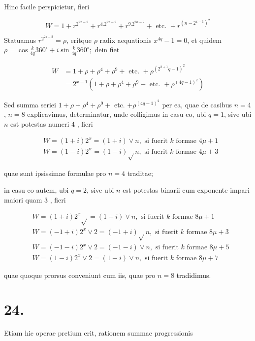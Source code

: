 \documentclass[10pt]{article}
\begin{document}
Hinc facile perspicietur, fieri

\[
W=1+r^{2^{2 x-2}}+r^{4.2^{2 x-2}}+r^{9.2^{2 \alpha-2}}+\text { etc. }+r^{\left(n-2^{x-1}\right)^{2}}
\]

Statuamus \(r^{2^{2 z-2}}=\rho\), eritque \(\rho\) radix aequationis \(x^{4 q}-1=0\), et quidem \(\rho=\cos \frac{k}{4 q} 360^{\circ}+i \sin \frac{k}{4 q} 360^{\circ} ;\) dein fiet

\[
\begin{aligned}
W & =1+\rho+\rho^{4}+\rho^{9}+\text { etc. }+\rho^{\left(2^{2+1} q-1\right)^{2}} \\
& =2^{x-1}\left(1+\rho+\rho^{4}+\rho^{9}+\text { etc. }+\rho^{(4 q-1)^{2}}\right)
\end{aligned}
\]

Sed summa seriei \(1+\rho+\rho^{4}+\rho^{9}+\) etc. \(+\rho^{(4 q-1)^{2}}\) per ea, quae de casibus \(n=4\), \(n=8\) explicavimus, determinatur, unde colligimus in casu eo, ubi \(q=1\), sive ubi \(n\) est potestas numeri 4 , fieri

\[
\begin{aligned}
& W=(1+i) 2^{x}=(1+i) \vee n, \text { si fuerit } k \text { formae } 4 \mu+1 \\
& W=(1-i) 2^{\alpha}=(1-i) \sqrt{ } n, \text { si fuerit } k \text { formae } 4 \mu+3
\end{aligned}
\]

quae sunt ipsissimae formulae pro \(n=4\) traditae;

in casu eo autem, ubi \(q=2\), sive ubi \(n\) est potestas binarii cum exponente impari maiori quam 3 , fieri

\[
\begin{aligned}
& W=(1+i) 2^{x} \sqrt{ }=(1+i) \vee n, \text { si fuerit } k \text { formae } 8 \mu+1 \\
& W=(-1+i) 2^{x} \vee 2=(-1+i) \sqrt{ } n, \text { si fuerit } k \text { formae } 8 \mu+3 \\
& W=(-1-i) 2^{x} \vee 2=(-1-i) \vee n, \text { si fuerit } k \text { formae } 8 \mu+5 \\
& W=(1-i) 2^{x} \vee 2=(1-i) \vee n, \text { si fuerit } k \text { formae } 8 \mu+7
\end{aligned}
\]

quae quoque prorsus conveniunt cum iis, quae pro \(n=8\) tradidimus.

\section*{24.}
Etiam hic operae pretium erit, rationem summae progressionis
\end{document}
